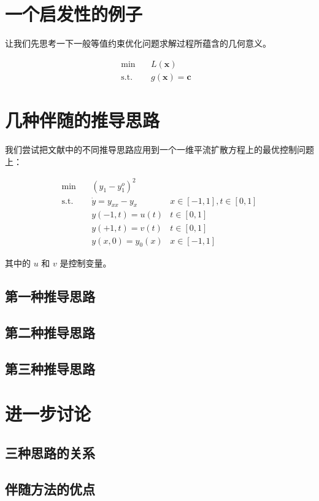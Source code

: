 \documentclass[a4paper,12pt]{article}
\begin{document}
\section{一个启发性的例子}

让我们先思考一下一般等值约束优化问题求解过程所蕴含的几何意义。

$$
\begin{array}{rcll}
\min &~& L(\mathbf{x}) & \\
\mathrm{s.t.} &~& g(\mathbf{x}) = \mathbf{c}
\end{array}
$$


\section{几种伴随的推导思路}

我们尝试把文献中的不同推导思路应用到一个一维平流扩散方程上的最优控制问题上：

$$
\begin{array}{rcll}
\min &~& (y_1 - y_1^o)^2 & \\
\mathrm{s.t.} &~& \dot{y} = y_{xx} - y_x & x \in [-1, 1], t \in [0, 1]\\
&~& y(-1, t) = u(t) & t \in [0, 1]\\
&~& y(+1, t) = v(t) & t \in [0, 1]\\
&~& y(x, 0) = y_0(x) & x \in [-1, 1]
\end{array}
$$

其中的 $ u $ 和 $ v $ 是控制变量。

\subsection{第一种推导思路}

\subsection{第二种推导思路}

\subsection{第三种推导思路}

\section{进一步讨论}

\subsection{三种思路的关系}

\subsection{伴随方法的优点}
\end{document}
